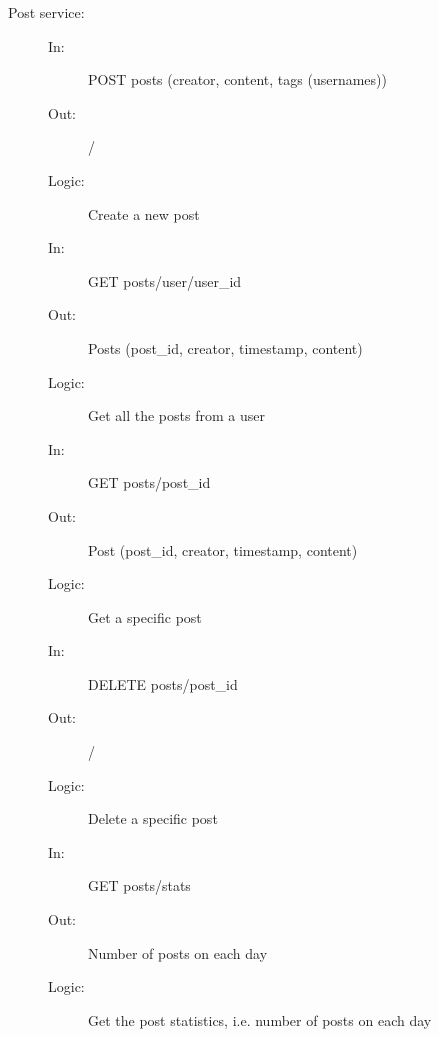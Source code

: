 \documentclass{article}
\begin{document}
\begin{description}
    \item [Post service:]
    \begin{description}
        \item[]
        \item[In:] POST posts (creator, content, tags (usernames))
        \item[Out:] /
        \item[Logic:] Create a new post
        \item[]

        \item[In:] GET posts/user/user\_id
        \item[Out:] Posts (post\_id, creator, timestamp, content)
        \item[Logic:] Get all the posts from a user
        \item[]

        \item[In:] GET posts/post\_id
        \item[Out:] Post (post\_id, creator, timestamp, content)
        \item[Logic:] Get a specific post
        \item[]

        \item[In:] DELETE posts/post\_id
        \item[Out:] /
        \item[Logic:] Delete a specific post
        \item[]
        
        \item[In:] GET posts/stats
        \item[Out:] Number of posts on each day
        \item[Logic:] Get the post statistics, i.e. number of posts on each day
    \end{description}
\end{description}
\end{document}
